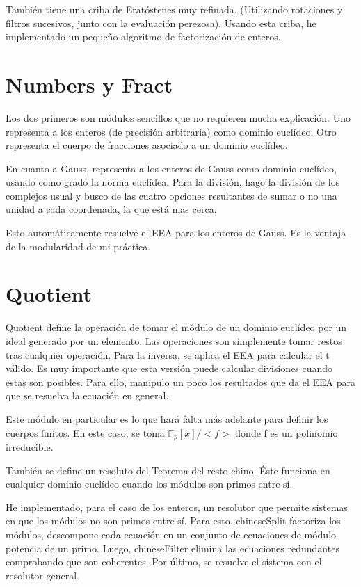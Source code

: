 \documentclass[12pt, a5paper]{article}
\theoremstyle{definition}
\begin{document}
También tiene una criba de Eratóstenes muy refinada, (Utilizando
rotaciones y filtros sucesivos, junto con la evaluación perezosa).
Usando esta criba, he implementado un pequeño algoritmo de
factorización de enteros.
\newpage\newpage

\section{Numbers y Fract}
Los dos primeros son  módulos sencillos que no requieren mucha explicación.
Uno representa a los enteros (de precisión arbitraria) como dominio
euclídeo. Otro representa el cuerpo de fracciones asociado a un
dominio euclídeo.

En cuanto a Gauss, representa a los enteros de Gauss como dominio
euclídeo, usando como grado la norma euclídea. Para la división, hago
la división de los complejos usual y busco de las cuatro opciones
resultantes de sumar o no una unidad a cada coordenada, la que está
mas cerca.

Esto automáticamente resuelve el EEA para los enteros de Gauss. Es la
ventaja de la modularidad de mi práctica.

\newpage



\newpage

\section{Quotient}
Quotient define la operación de tomar el módulo de un dominio euclídeo
por un ideal generado por un elemento. Las operaciones son simplemente
tomar restos tras cualquier operación. Para la inversa, se aplica el
EEA para calcular el t válido. Es muy importante que esta versión
puede calcular divisiones cuando estas son posibles. Para ello,
manipulo un poco los resultados que da el EEA para que se resuelva la
ecuación en general.

Este módulo en particular es lo que hará falta más adelante para definir los
cuerpos finitos. En este caso, se toma $\mathbb{F}_p[x]/<f>$ donde f es un polinomio
irreducible. 

También se define un resoluto del Teorema del resto chino. Éste
funciona en cualquier dominio euclídeo cuando los módulos son primos
entre sí.

He implementado, para el caso de los enteros, un resolutor que permite
sistemas en que los módulos no son primos entre sí. Para esto, 
chineseSplit factoriza los módulos, descompone cada ecuación en un
conjunto de ecuaciones de módulo potencia de un primo. Luego,
chineseFilter elimina las ecuaciones redundantes comprobando que son
coherentes. Por último, se resuelve el sistema con el resolutor
general.
\end{document}
